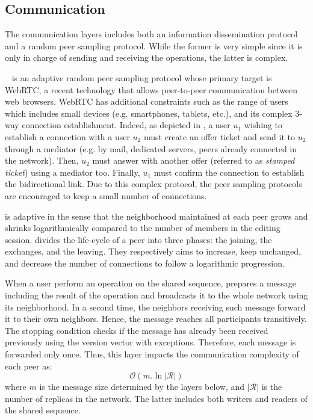 \subsection{Communication}
The communication layers includes both an information dissemination protocol and
a random peer sampling protocol. While the former is very simple since it is
only in charge of sending and receiving the operations, the latter is complex.

\SPRAY~\cite{nedelec2015spray} is an adaptive random peer sampling protocol
whose primary target is WebRTC, a recent technology that allows peer-to-peer
communication between web browsers. WebRTC has additional constraints such as
the range of users which includes small devices (e.g. smartphones, tablets,
etc.), and its complex 3-way connection establishment. Indeed, as depicted in
, a user $u_1$ wishing to establish a connection with a user $u_2$
must create an offer ticket and send it to $u_2$ through a mediator (e.g. by
mail, dedicated servers, peers already connected in the network). Then, $u_2$
must answer with another offer (referred to as \emph{stamped ticket}) using a
mediator too. Finally, $u_1$ must confirm the connection to establish the
bidirectional link. Due to this complex protocol, the peer sampling protocols
are encouraged to keep a small number of connections.

\SPRAY is adaptive in the sense that the neighborhood maintained at each peer
grows and shrinks logarithmically compared to the number of members in the
editing session. \SPRAY divides the life-cycle of a peer into three phases: the
joining, the exchanges, and the leaving. They respectively aims to increase,
keep unchanged, and decrease the number of connections to follow a logarithmic
progression.
  
When a user perform an operation on the shared sequence, \CRATE prepares a
message including the result of the operation and broadcasts it to the whole
network using its neighborhood. In a second time, the neighbors receiving such
message forward it to their own neighbors. Hence, the message reaches all
participants transitively. The stopping condition checks if the message has
already been received previously using the version vector with
exceptions. Therefore, each message is forwarded only once. Thus, this layer
impacts the communication complexity of each peer as:
\begin{equation}
  \mathcal{O}(m.\ln |\mathcal{R}| )
\end{equation}
where $m$ is the message size determined by the layers below, and
$|\mathcal{R}|$ is the number of replicas in the network. The latter includes
both writers and readers of the shared sequence.
  
